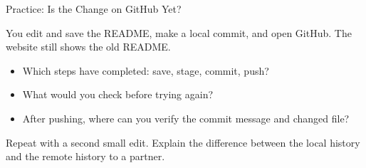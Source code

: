 \begin{frame}{Practice: Is the Change on GitHub Yet?}
\par
You edit and save the README, make a local commit, and open GitHub. The website still shows the old README.
\begin{itemize}
\item Which steps have completed: save, stage, commit, push?
\item What would you check before trying again?
\item After pushing, where can you verify the commit message and changed file?
\end{itemize}
\medskip
Repeat with a second small edit. Explain the difference between the local history and the remote history to a partner.
\end{frame}

